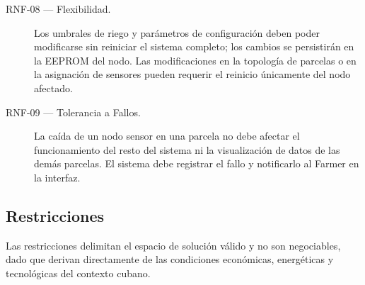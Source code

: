 \begin{description}
	\item[RNF-08 — Flexibilidad.]
	Los umbrales de riego y parámetros de configuración deben poder modificarse sin
	reiniciar el sistema completo; los cambios se persistirán en la EEPROM del nodo.
	Las modificaciones en la topología de parcelas o en la asignación de sensores pueden
	requerir el reinicio únicamente del nodo afectado.
	
	\item[RNF-09 — Tolerancia a Fallos.]
	La caída de un nodo sensor en una parcela no debe afectar el funcionamiento del resto
	del sistema ni la visualización de datos de las demás parcelas. El sistema debe registrar
	el fallo y notificarlo al Farmer en la interfaz.
	
\end{description}

\subsection{Restricciones}

Las restricciones delimitan el espacio de solución válido y no son negociables, dado que
derivan directamente de las condiciones económicas, energéticas y tecnológicas del contexto
cubano.

